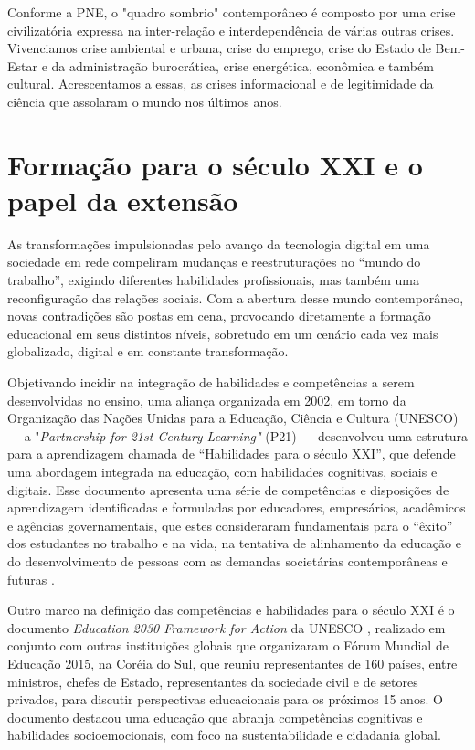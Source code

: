 \documentclass[portuguese]{textolivre}
\begin{document}
Conforme a PNE, o "quadro sombrio" contemporâneo é composto por uma
crise civilizatória expressa na inter-relação e interdependência de
várias outras crises. Vivenciamos crise ambiental e urbana, crise do
emprego, crise do Estado de Bem-Estar e da administração burocrática,
crise energética, econômica e também cultural. Acrescentamos a essas, as
crises informacional e de legitimidade da ciência que assolaram o mundo
nos últimos anos.


\section{Formação para o século XXI e o papel da extensão}

As transformações impulsionadas pelo avanço da tecnologia digital em uma
sociedade em rede \cite{Castells1999} compeliram mudanças e
reestruturações no ``mundo do trabalho'', exigindo diferentes
habilidades profissionais, mas também uma reconfiguração das relações
sociais. Com a abertura desse mundo contemporâneo, novas contradições
são postas em cena, provocando diretamente a formação educacional em
seus distintos níveis, sobretudo em um cenário cada vez mais
globalizado, digital e em constante transformação.

Objetivando incidir na integração de habilidades e competências a serem
desenvolvidas no ensino, uma aliança organizada em 2002, em torno da
Organização das Nações Unidas para a Educação, Ciência e Cultura
(UNESCO) --- a "\emph{Partnership for 21st Century Learning"} (P21) ---
desenvolveu uma estrutura para a aprendizagem chamada de ``Habilidades
para o século XXI'', que defende uma abordagem integrada na educação,
com habilidades cognitivas, sociais e digitais. Esse documento apresenta
uma série de competências e disposições de aprendizagem identificadas e
formuladas por educadores, empresários, acadêmicos e agências
governamentais, que estes consideraram fundamentais para o ``êxito'' dos
estudantes no trabalho e na vida, na tentativa de alinhamento da
educação e do desenvolvimento de pessoas com as demandas societárias
contemporâneas e futuras \cite{Dede2009}.

Outro marco na definição das competências e habilidades para o século
XXI é o documento \emph{Education 2030 Framework for Action} da UNESCO
\cite{UNESCO2016}, realizado em conjunto com outras instituições
globais que organizaram o Fórum Mundial de Educação 2015, na Coréia do
Sul, que reuniu representantes de 160 países, entre ministros, chefes de
Estado, representantes da sociedade civil e de setores privados, para
discutir perspectivas educacionais para os próximos 15 anos. O documento
destacou uma educação que abranja competências cognitivas e habilidades
socioemocionais, com foco na sustentabilidade e cidadania global.
\end{document}
